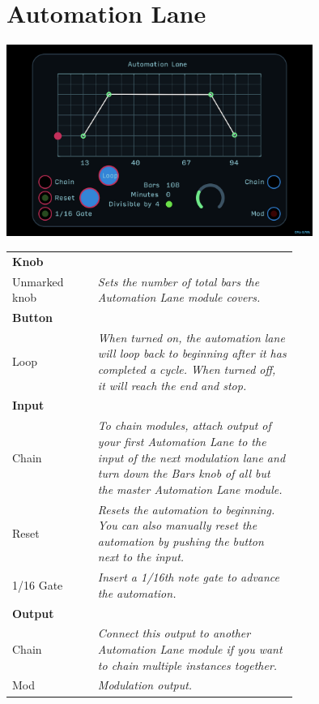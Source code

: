 \documentclass[11pt]{book}
\begin{document}
\pagebreak


\section{Automation Lane}

\begin{center}
\includegraphics[width=0.75\textwidth]{automation-lane.png}
\end{center}

\begin{table}[ht]
\small
\sffamily
\renewcommand\arraystretch{1.5}
\centering
\begin{tabular}{l*{1}{>{\raggedright\arraybackslash}p{0.7\linewidth}}}

\toprule
\textbf{Knob} \\
Unmarked knob & \textit{Sets the number of total bars the Automation Lane module covers.} \\

\midrule
\textbf{Button} \\
Loop & \textit{When turned on, the automation lane will loop back to beginning after it has completed a cycle. When turned off, it will reach the end and stop.} \\

\midrule
\textbf{Input} \\
Chain & \textit{To chain modules, attach output of your first Automation Lane to the input of the next modulation lane and turn down the Bars knob of all but the master Automation Lane module.} \\
Reset & \textit{Resets the automation to beginning. You can also manually reset the automation by pushing the button next to the input.} \\
1/16 Gate & \textit{Insert a 1/16th note gate to advance the automation.} \\

\midrule
\textbf{Output} \\
Chain & \textit{Connect this output to another Automation Lane module if you want to chain multiple instances together.} \\
Mod & \textit{Modulation output.} \\

\bottomrule
\end{tabular}
\end{table}
\end{document}
